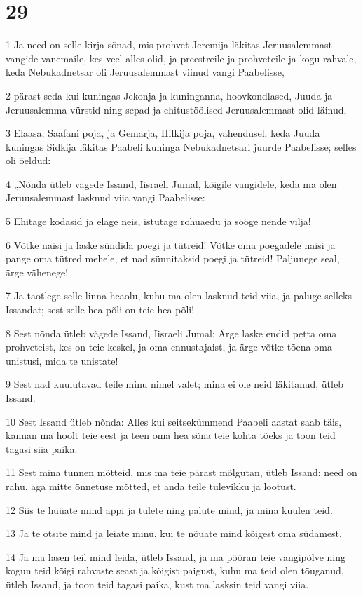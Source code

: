 \chapter{29}

\par 1 Ja need on selle kirja sõnad, mis prohvet Jeremija läkitas Jeruusalemmast vangide vanemaile, kes veel alles olid, ja preestreile ja prohveteile ja kogu rahvale, keda Nebukadnetsar oli Jeruusalemmast viinud vangi Paabelisse,
\par 2 pärast seda kui kuningas Jekonja ja kuninganna, hoovkondlased, Juuda ja Jeruusalemma vürstid ning sepad ja ehitustöölised Jeruusalemmast olid läinud,
\par 3 Elaasa, Saafani poja, ja Gemarja, Hilkija poja, vahendusel, keda Juuda kuningas Sidkija läkitas Paabeli kuninga Nebukadnetsari juurde Paabelisse; selles oli öeldud:
\par 4 „Nõnda ütleb vägede Issand, Iisraeli Jumal, kõigile vangidele, keda ma olen Jeruusalemmast lasknud viia vangi Paabelisse:
\par 5 Ehitage kodasid ja elage neis, istutage rohuaedu ja sööge nende vilja!
\par 6 Võtke naisi ja laske sündida poegi ja tütreid! Võtke oma poegadele naisi ja pange oma tütred mehele, et nad sünnitaksid poegi ja tütreid! Paljunege seal, ärge vähenege!
\par 7 Ja taotlege selle linna heaolu, kuhu ma olen lasknud teid viia, ja paluge selleks Issandat; sest selle hea põli on teie hea põli!
\par 8 Sest nõnda ütleb vägede Issand, Iisraeli Jumal: Ärge laske endid petta oma prohveteist, kes on teie keskel, ja oma ennustajaist, ja ärge võtke tõena oma unistusi, mida te unistate!
\par 9 Sest nad kuulutavad teile minu nimel valet; mina ei ole neid läkitanud, ütleb Issand.
\par 10 Sest Issand ütleb nõnda: Alles kui seitsekümmend Paabeli aastat saab täis, kannan ma hoolt teie eest ja teen oma hea sõna teie kohta tõeks ja toon teid tagasi siia paika.
\par 11 Sest mina tunnen mõtteid, mis ma teie pärast mõlgutan, ütleb Issand: need on rahu, aga mitte õnnetuse mõtted, et anda teile tulevikku ja lootust.
\par 12 Siis te hüüate mind appi ja tulete ning palute mind, ja mina kuulen teid.
\par 13 Ja te otsite mind ja leiate minu, kui te nõuate mind kõigest oma südamest.
\par 14 Ja ma lasen teil mind leida, ütleb Issand, ja ma pööran teie vangipõlve ning kogun teid kõigi rahvaste seast ja kõigist paigust, kuhu ma teid olen tõuganud, ütleb Issand, ja toon teid tagasi paika, kust ma lasksin teid vangi viia.

